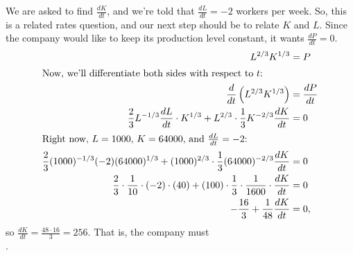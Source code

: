 \documentclass{article}
\begin{document}
\begin{enumerate}
    \begin{solution} %
        We are asked to find $\frac{dK}{dt}$, and we're told that
        $\frac{dL}{dt} = -2$ workers per week. So, this is a related
        rates question, and our next step should be to relate $K$ and $L$.
        Since the company would like to keep its production
            level constant, it wants $\frac{dP}{dt} = 0$.
        \begin{align*}
            L^{2/3} K^{1/3} &= P \\
            \intertext{Now, we'll differentiate both sides with respect to
                $t$:} \frac{d}{dt} \left( L^{2/3} K^{1/3} \right) &=
            \frac{dP}{dt} \\
            \frac{2}{3} L^{-1/3} \frac{dL}{dt} \cdot K^{1/3} + L^{2/3}
            \cdot \frac{1}{3} K^{-2/3} \frac{dK}{dt} &= 0 \\
            \intertext{Right now, $L = 1000$, $K = 64000$, and
                $\frac{dL}{dt} = -2$:} \frac{2}{3} (1000)^{-1/3} (-2)
            (64000)^{1/3} + (1000)^{2/3} \cdot \frac{1}{3}
            (64000)^{-2/3} \frac{dK}{dt} &= 0 \\
            \frac{2}{3} \cdot \frac{1}{10} \cdot (-2) \cdot (40) + (100)
            \cdot \frac{1}{3} \cdot \frac{1}{1600} \cdot \frac{dK}{dt}
            &= 0 \\
            -\frac{16}{3} + \frac{1}{48} \frac{dK}{dt} &= 0,
        \end{align*}
        so $\displaystyle \frac{dK}{dt} = \frac{48 \cdot 16}{3} = 256$.
        That is, the company must \\ . 
    \end{solution}

 
\end{enumerate}
\end{document}
